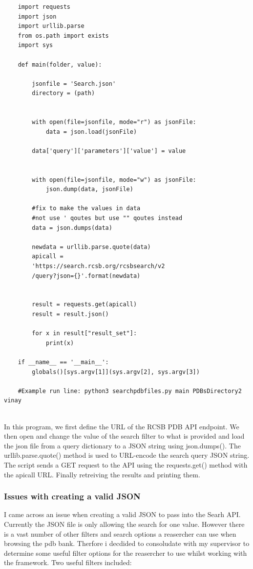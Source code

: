 \documentclass[]{final_report}
\begin{document}
\begin{lstlisting}
    import requests
    import json
    import urllib.parse
    from os.path import exists
    import sys
    
    def main(folder, value):
    
        jsonfile = 'Search.json'
        directory = (path)
    
    
        with open(file=jsonfile, mode="r") as jsonFile:
            data = json.load(jsonFile)
    
        data['query']['parameters']['value'] = value
    
    
        with open(file=jsonfile, mode="w") as jsonFile:
            json.dump(data, jsonFile)
    
        #fix to make the values in data 
        #not use ' qoutes but use "" qoutes instead
        data = json.dumps(data)
    
        newdata = urllib.parse.quote(data)
        apicall = 
        'https://search.rcsb.org/rcsbsearch/v2
        /query?json={}'.format(newdata)
    
    
        result = requests.get(apicall)
        result = result.json()
    
        for x in result["result_set"]:
            print(x)
    
    if __name__ == '__main__':
        globals()[sys.argv[1]](sys.argv[2], sys.argv[3])
    
    #Example run line: python3 searchpdbfiles.py main PDBsDirectory2 vinay
    
\end{lstlisting}

In this program, we first define the URL of the RCSB PDB API endpoint. We then open and change the value of the search filter to what is provided and load the json file from a query dictionary to a JSON string using json.dumps(). The urllib.parse.quote() method is used to URL-encode the search query JSON string. The script sends a GET request to the API using the requests.get() method with the apicall URL. Finally retreiving the results and printing them.

\subsubsection{Issues with creating a valid JSON}

I came across an issue when creating a valid JSON to pass into the Searh API. Currently the JSON file is only allowing the search for one value. However there is a vast number of other filters and search options a reasercher can use when browsing the pdb bank. Therfore i decdided to consoludate with my supervisor to determine some useful filter options for the reasercher to use whilst working with the framework. Two useful filters included:
\end{document}

